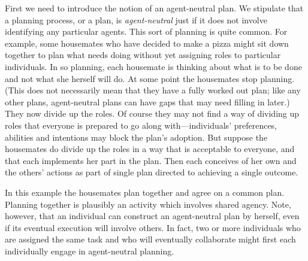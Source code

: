 \documentclass[12pt,\papersize]{extarticle}
\begin{document}

First we need to introduce the notion of an agent-neutral plan.
We stipulate that a planning process, or a plan, is \emph{agent-neutral} just if it does not involve identifying any particular agents.  
This sort of planning is quite common.
For example, some housemates who have decided to make a pizza might sit down together to plan what needs doing without yet assigning roles to particular individuals. 
In so planning, each housemate is thinking about what is to be done and not what she herself will do.  
At some point the housemates stop planning.
(This does not necessarily mean that they have a fully worked out plan; like any other plans, agent-neutral plans can have gaps that may need filling in later.)
They now divide up the roles.
Of course they may not find a way of dividing up roles that everyone is prepared to go along with---individuals' preferences, abilities and intentions may block the plan's adoption.
But suppose the housemates do divide up the roles in a way that is acceptable to everyone, 
	and that each implements her part in the plan.
Then each conceives of her own and the others' actions as part of single plan directed to achieving a single outcome.

In this example
	the housemates plan together and agree on a common plan.
	Planning together is plausibly an activity which involves shared agency.
	Note, however, that an individual can construct an agent-neutral plan by herself, even if its eventual execution will involve others. 
	In fact, two or more individuals who are assigned the same task and who will eventually collaborate might first each individually engage in agent-neutral planning.
	
\end{document}
